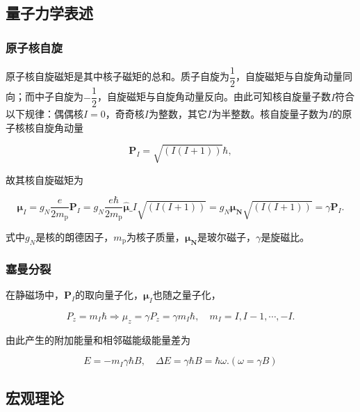 \subsection{量子力学表述}\label{ux91cfux5b50ux529bux5b66ux8868ux8ff0}

\subsubsection{原子核自旋}\label{ux539fux5b50ux6838ux81eaux65cb}

原子核自旋磁矩是其中核子磁矩的总和。质子自旋为\(\dfrac{1}{2}\)，自旋磁矩与自旋角动量同向；而中子自旋为\(-\dfrac{1}{2}​\)，自旋磁矩与自旋角动量反向。由此可知核自旋量子数\(I​\)符合以下规律：偶偶核\(I=0​\)，奇奇核\(I​\)为整数，其它\(I​\)为半整数。核自旋量子数为\(I​\)的原子核核自旋角动量

\begin{equation}
\boldsymbol{P}_{I} = \sqrt{(I(I+1))}\hbar,
\end{equation}

故其核自旋磁矩为

\begin{equation}
    \boldsymbol{\mu}_{I} = g_N\dfrac{e}{2m_{\text{p}}}\boldsymbol{P}_{I} = g_N\dfrac{e\hbar}{2m_{\text{p}}}\hat{\boldsymbol{\mu}}\_I\sqrt{(I(I+1))} = g_N\boldsymbol{\mu_N}\sqrt{(I(I+1))} = \gamma \boldsymbol{P}_{I}.
\end{equation}

式中\(g_N\)是核的朗德因子，\(m_{\text{p}}\)为核子质量，\(\boldsymbol{\mu_N}\)是玻尔磁子，\(\gamma\)是旋磁比。

\subsubsection{塞曼分裂}\label{ux585eux66fcux5206ux88c2}

在静磁场中，\(\boldsymbol{P}_I\)的取向量子化，\(\boldsymbol{\mu}_I\)也随之量子化，

\begin{equation}
    P_z = m_I\hbar\Rightarrow \mu_z = \gamma P_z=\gamma m_I\hbar,\quad m_I = I,I-1,\cdots,-I.
\end{equation}

由此产生的附加能量和相邻磁能级能量差为

\begin{equation}
    E = -m_I\gamma\hbar B,\quad \Delta E = \gamma\hbar B = \hbar \omega. (\omega = \gamma B)
\end{equation}

\subsection{宏观理论}\label{ux5b8fux89c2ux7406ux8bba}

